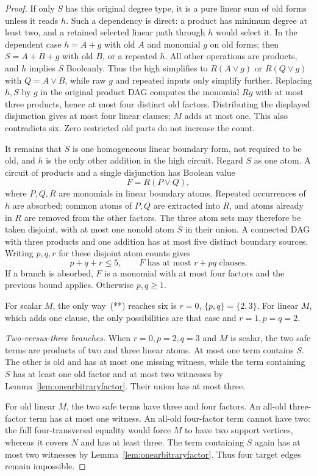 \documentclass[11pt]{article}
\theoremstyle{definition}
\theoremstyle{remark}
\begin{document}
\begin{proof}
If only $S$ has this original degree type, it is a pure linear sum of old forms unless it reads $h$. Such a dependency is direct: a product has minimum degree at least two, and a retained selected linear path through $h$ would select it. In the dependent case $h=A+g$ with old $A$ and monomial $g$ on old forms; then $S=A+B+g$ with old $B$, or a repeated $h$. All other operations are products, and $h$ implies $S$ Booleanly. Thus the high simplifies to $R(A\vee g)$ or $R(Q\vee g)$ with $Q=A\vee B$, while raw $g$ and repeated inputs only simplify further. Replacing $h,S$ by $g$ in the original product DAG computes the monomial $Rg$ with at most three products, hence at most four distinct old factors. Distributing the displayed disjunction gives at most four linear clauses; $M$ adds at most one. This also contradicts six. Zero restricted old parts do not increase the count.

It remains that $S$ is one homogeneous linear boundary form, not required to be old, and $h$ is the only other addition in the high circuit. Regard $S$ as one atom. A circuit of products and a single disjunction has Boolean value
\[
 F=R(P\vee Q),
\]
where $P,Q,R$ are monomials in linear boundary atoms. Repeated occurrences of $h$ are absorbed; common atoms of $P,Q$ are extracted into $R$, and atoms already in $R$ are removed from the other factors. The three atom sets may therefore be taken disjoint, with at most one nonold atom $S$ in their union. A connected DAG with three products and one addition has at most five distinct boundary sources. Writing $p,q,r$ for these disjoint atom counts gives
\[
 p+q+r\le5,\qquad F\text{ has at most }r+pq\text{ clauses}.       \tag{**}
\]
If a branch is absorbed, $F$ is a monomial with at most four factors and the previous bound applies. Otherwise $p,q\ge1$.

For scalar $M$, the only way~(**) reaches six is $r=0$, $\{p,q\}=\{2,3\}$. For linear $M$, which adds one clause, the only possibilities are that case and $r=1,p=q=2$.

\emph{Two-versus-three branches.} When $r=0,p=2,q=3$ and $M$ is scalar, the two safe terms are products of two and three linear atoms. At most one term contains $S$. The other is old and has at most one missing witness, while the term containing $S$ has at least one old factor and at most two witnesses by Lemma~\ref{lem:onearbitraryfactor}. Their union has at most three.

For old linear $M$, the two safe terms have three and four factors. An all-old three-factor term has at most one witness. An all-old four-factor term cannot have two: the full four-transversal equality would force $M$ to have two support vertices, whereas it covers $N$ and has at least three. The term containing $S$ again has at most two witnesses by Lemma~\ref{lem:onearbitraryfactor}. Thus four target edges remain impossible.


\end{proof}
\end{document}
